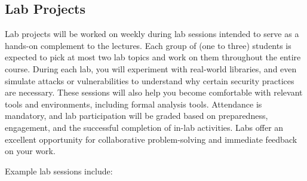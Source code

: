 \documentclass[10pt,a4paper,american]{exam}
\begin{document}
\subsection{Lab Projects}
Lab projects will be worked on weekly during lab sessions intended to serve as a hands-on complement to the lectures. Each group of (one to three) students is expected to pick at most two lab topics and work on them throughout the entire course. During each lab, you will experiment with real-world libraries, and even simulate attacks or vulnerabilities to understand why certain security practices are necessary. These sessions will also help you become comfortable with relevant tools and environments, including formal analysis tools. Attendance is mandatory, and lab participation will be graded based on preparedness, engagement, and the successful completion of in-lab activities. Labs offer an excellent opportunity for collaborative problem-solving and immediate feedback on your work.

Example lab sessions include:
\end{document}
